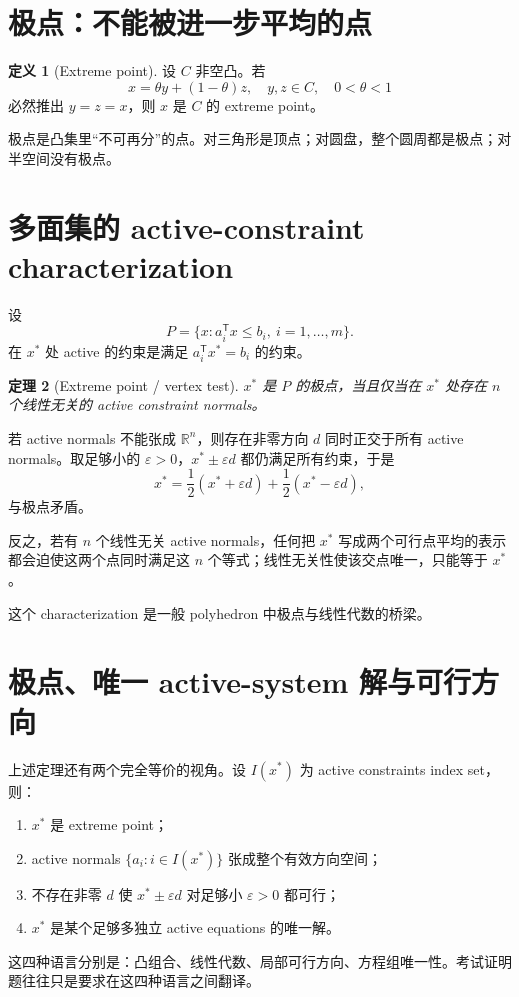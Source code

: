 \documentclass[11pt,a4paper,openany]{ctexrep}
\newtheorem{theorem}{定理}[chapter]
\theoremstyle{definition}
\newtheorem{definition}[theorem]{定义}
\newcommand{\R}{\mathbb{R}}
\newcommand{\transpose}{\mathsf{T}}
\newcommand{\eps}{\varepsilon}
\begin{document}
\section{极点：不能被进一步平均的点}

\begin{definition}[Extreme point]
设 $C$ 非空凸。若
\[
x=\theta y+(1-\theta)z,\quad y,z\in C,\quad0<\theta<1
\]
必然推出 $y=z=x$，则 $x$ 是 $C$ 的 extreme point。
\end{definition}

极点是凸集里“不可再分”的点。对三角形是顶点；对圆盘，整个圆周都是极点；对半空间没有极点。

\section{多面集的 active-constraint characterization}
设
\[
P=\{x:a_i^\transpose x\le b_i,\ i=1,\dots,m\}.
\]
在 $x^*$ 处 active 的约束是满足 $a_i^\transpose x^*=b_i$ 的约束。

\begin{theorem}[Extreme point / vertex test]
$x^*$ 是 $P$ 的极点，当且仅当在 $x^*$ 处存在 $n$ 个线性无关的 active constraint normals。
\end{theorem}

\begin{proofmap}[证明机制]
若 active normals 不能张成 $\R^n$，则存在非零方向 $d$ 同时正交于所有 active normals。取足够小的 $\eps>0$，$x^*\pm\eps d$ 都仍满足所有约束，于是
\[
x^*=\frac12(x^*+\eps d)+\frac12(x^*-\eps d),
\]
与极点矛盾。

反之，若有 $n$ 个线性无关 active normals，任何把 $x^*$ 写成两个可行点平均的表示都会迫使这两个点同时满足这 $n$ 个等式；线性无关性使该交点唯一，只能等于 $x^*$。
\end{proofmap}

这个 characterization 是一般 polyhedron 中极点与线性代数的桥梁。\par\noindent\cite[Ch.~2]{bertsimas}\;\cite[Appendix~B.2.8]{bental}


\section{极点、唯一 active-system 解与可行方向}
上述定理还有两个完全等价的视角。设 $I(x^*)$ 为 active constraints index set，则：
\begin{enumerate}[leftmargin=2.2em]
  \item $x^*$ 是 extreme point；
  \item active normals $\{a_i:i\in I(x^*)\}$ 张成整个有效方向空间；
  \item 不存在非零 $d$ 使 $x^*\pm\eps d$ 对足够小 $\eps>0$ 都可行；
  \item $x^*$ 是某个足够多独立 active equations 的唯一解。
\end{enumerate}
这四种语言分别是：凸组合、线性代数、局部可行方向、方程组唯一性。考试证明题往往只是要求在这四种语言之间翻译。
\end{document}
